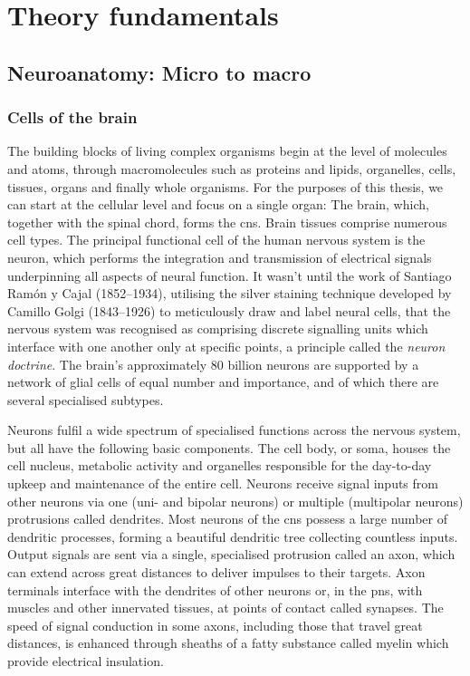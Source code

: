 
\chapter{Theory fundamentals}
\label{theory}

\section{Neuroanatomy: Micro to macro}

\subsection{Cells of the brain}

The building blocks of living complex organisms begin at the level of molecules and atoms, through macromolecules such as proteins and lipids, organelles, cells, tissues, organs and finally whole organisms.
For the purposes of this thesis, we can start at the cellular level and focus on a single organ:
The brain, which, together with the spinal chord, forms the \gls{cns}.
Brain tissues comprise numerous cell types.
The principal functional cell of the human nervous system is the neuron, which performs the integration and transmission of electrical signals underpinning all aspects of neural function.
It wasn't until the work of Santiago Ramón y Cajal (1852--1934), utilising the silver staining technique developed by Camillo Golgi (1843--1926) to meticulously draw and label neural cells, that the nervous system was recognised as comprising discrete signalling units which interface with one another only at specific points, a principle called the \textit{neuron doctrine}.\autocite{Kandel2021a}
The brain's approximately 80 billion neurons are supported by a network of glial cells of equal number and importance,\autocite{Herculano-Houzel2014,vonBartheld2016} and of which there are several specialised subtypes.

Neurons fulfil a wide spectrum of specialised functions across the nervous system, but all have the following basic components.
The cell body, or soma, houses the cell nucleus, metabolic activity and organelles responsible for the day-to-day upkeep and maintenance of the entire cell.
Neurons receive signal inputs from other neurons via one (uni- and bipolar neurons) or multiple (multipolar neurons) protrusions called dendrites.
Most neurons of the \gls{cns} possess a large number of dendritic processes, forming a beautiful dendritic tree collecting countless inputs.
Output signals are sent via a single, specialised protrusion called an axon, which can extend across great distances to deliver impulses to their targets.
Axon terminals interface with the dendrites of other neurons or, in the \gls{pns}, with muscles and other innervated tissues, at points of contact called synapses.
The speed of signal conduction in some axons, including those that travel great distances, is enhanced through sheaths of a fatty substance called myelin which provide electrical insulation.

